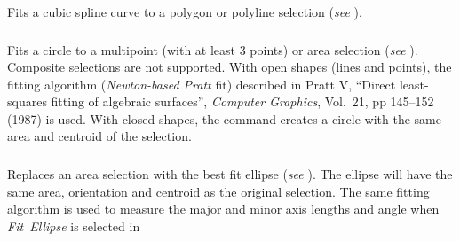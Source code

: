 Fits a cubic spline curve to a polygon or
polyline selection (\emph{see} ). 




\subsubsection{\protect{}\label{sub:Fit-Circle}}

Fits a circle
to a multipoint (with at least 3 points) or area selection \cite{C-FitCircle}
(\emph{see} ). Composite selections
are not supported. With open shapes (lines and points), the fitting
algorithm (\emph{Newton-based Pratt} fit) described in Pratt V, ``Direct
least-squares fitting of algebraic surfaces'', \emph{Computer Graphics},
Vol.\ 21, pp 145--152 (1987) is used. With closed shapes, the command
creates a circle with the same area and centroid of the selection.


\subsubsection[\protect\userinterface{Fit Ellipse}]{\protect{}\label{sub:Fit-Ellipse}\improvement{}}

Replaces an area selection with the best fit ellipse
(\emph{see} ). The ellipse will have
the same area, orientation and centroid as the original selection.
The same fitting algorithm is used to measure the major and minor
axis lengths and angle when \emph{Fit~Ellipse} is selected in {\small {}}{\small \par}




\subsubsection[\protect\userinterface{Interpolate}]{\protect{}\label{sub:Interpolate}}

